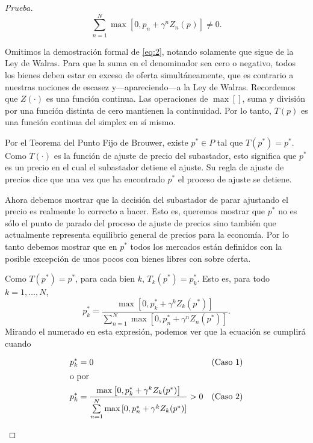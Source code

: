 \documentclass[10pt,a4paper]{article}
\theoremstyle{definition}
\newcommand{\brouwer}{Teorema del Punto Fijo de Brouwer}
\newcommand{\walrass}{Ley de Walras}
\newcommand{\mmax}[2]{\max\left[#1,#2\right]}
\newcommand{\gzp}[2][]{\gamma^{#2}Z_{#2}(p^{#1})}
\newcommand{\pp}{p^{\ast}}
\begin{document}
\begin{proof}[Prueba]
\begin{equation}\label{eq:2}
\sum_{n=1}^{N}\mmax{0}{p_n+\gzp{n}}\neq0.
\end{equation}

Omitimos la demostración formal de \eqref{eq:2}, notando solamente que sigue de la \walrass. Para que la suma en el denominador sea cero o negativo, todos los bienes deben estar en exceso de oferta simultáneamente, que es contrario a nuestras nociones de escasez y---apareciendo---a la \walrass. Recordemos que $Z(\cdot)$ es una función continua. Las operaciones de $\max\left[\right]$, suma y división por una función distinta de cero mantienen la continuidad. Por lo tanto, $T(p)$ es una función continua del simplex en sí mismo.
\setlength{\parskip}{1em}
\setlength{\parindent}{0pt}

Por el \brouwer, existe $\pp\in P$ tal que $T(\pp)=\pp$. Como $T(\cdot)$ es la función de ajuste de precio del subastador, esto significa que $\pp$ es un precio en el cual el subastador detiene el ajuste. Su regla de ajuste de precios dice que una vez que ha encontrado $\pp$ el proceso de ajuste se detiene.

Ahora debemos mostrar que la decisión del subastador de parar ajustando el precio es realmente lo correcto a hacer. Esto es, queremos mostrar que $\pp$ no es sólo el punto de parado del proceso de ajuste de precios sino también que actualmente representa equilibrio general de precios para la economía. Por lo tanto debemos mostrar que en $\pp$ todos los mercados están definidos con la posible excepción de unos pocos con bienes libres con sobre oferta.

Como $T(\pp)=\pp$, para cada bien $k$, $T_k(\pp)=\pp_k$. Esto es, para todo $k=1,\ldots,N$,
\begin{equation}\label{eq:3}
\pp_k=\frac{\mmax{0}{\pp_k+\gzp[\ast]{k}}}{\sum\limits_{n=1}^{N}\mmax{0}{\pp_n+\gzp[\ast]{n}}}.
\end{equation}
Mirando el numerado en esta expresión, podemos ver que la ecuación se cumplirá cuando

\begin{align}
\pp_k & = 0 	&(\text{Caso 1})\\
\intertext{o por}
\pp_k& = \frac{\mmax{0}{\pp_k+\gzp[\ast]{k}}}{\sum\limits_{n=1}^N\mmax{0}{\pp_n+\gzp[\ast]{k}}}>0		&	(\text{Caso 2})
\end{align}

\begin{enumerate}[label={\bfseries Caso~\arabic*},wide =\parindent]


\end{enumerate}
\end{proof}
\end{document}
